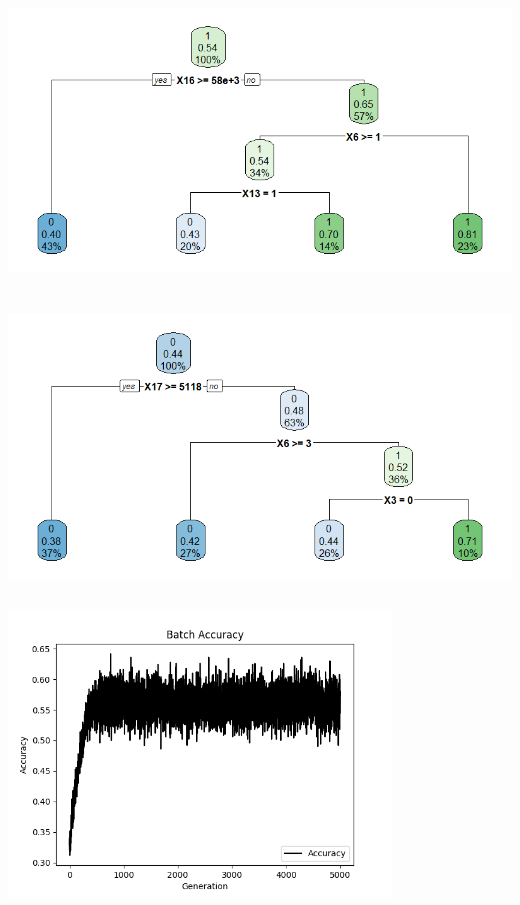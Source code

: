 \begin{center}
\includegraphics[height=3.0in]{figuras/Rplot1.png}
\end{center}

\begin{center}
\includegraphics[height=3.0in]{figuras/Rplot2.png}
\end{center}

\begin{center}
\includegraphics[height=3.0in]{figuras/Figure_1.png}
\end{center}

